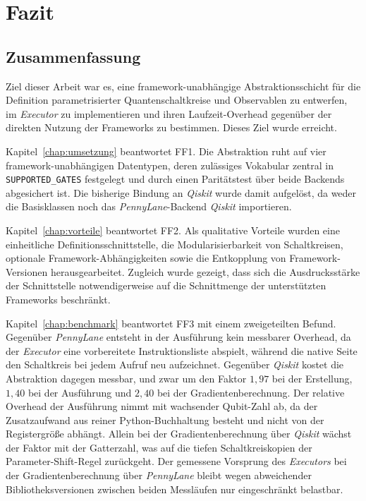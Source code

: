 \chapter{Fazit}
\label{chap:fazit}
\section{Zusammenfassung}

Ziel dieser Arbeit war es, eine framework-unabhängige Abstraktionsschicht für die
Definition parametrisierter Quantenschaltkreise und Observablen zu entwerfen, im
\textit{Executor} zu implementieren und ihren Laufzeit-Overhead gegenüber der
direkten Nutzung der Frameworks zu bestimmen. Dieses Ziel wurde erreicht.

Kapitel~\ref{chap:umsetzung} beantwortet FF1. Die Abstraktion ruht auf vier
framework-unabhängigen Datentypen, deren zulässiges Vokabular zentral in
\texttt{SUPPORTED\_GATES} festgelegt und durch einen Paritätstest über beide
Backends abgesichert ist. Die bisherige Bindung an \textit{Qiskit} wurde damit
aufgelöst, da weder die Basisklassen noch das \textit{PennyLane}-Backend
\textit{Qiskit} importieren.

Kapitel~\ref{chap:vorteile} beantwortet FF2. Als qualitative Vorteile wurden eine
einheitliche Definitionsschnittstelle, die Modularisierbarkeit von Schaltkreisen,
optionale Framework-Abhängigkeiten sowie die Entkopplung von Framework-Versionen
herausgearbeitet. Zugleich wurde gezeigt, dass sich die Ausdrucksstärke der
Schnittstelle notwendigerweise auf die Schnittmenge der unterstützten Frameworks
beschränkt.

Kapitel~\ref{chap:benchmark} beantwortet FF3 mit einem zweigeteilten Befund.
Gegenüber \textit{PennyLane} entsteht in der Ausführung kein messbarer Overhead, da
der \textit{Executor} eine vorbereitete Instruktionsliste abspielt, während die
native Seite den Schaltkreis bei jedem Aufruf neu aufzeichnet. Gegenüber
\textit{Qiskit} kostet die Abstraktion dagegen messbar, und zwar um den Faktor
$1{,}97$ bei der Erstellung, $1{,}40$ bei der Ausführung und $2{,}40$ bei der
Gradientenberechnung. Der relative Overhead der Ausführung nimmt mit wachsender
Qubit-Zahl ab, da der Zusatzaufwand aus reiner Python-Buchhaltung besteht und nicht
von der Registergröße abhängt. Allein bei der Gradientenberechnung über
\textit{Qiskit} wächst der Faktor mit der Gatterzahl, was auf die tiefen
Schaltkreiskopien der Parameter-Shift-Regel zurückgeht. Der gemessene Vorsprung des
\textit{Executors} bei der Gradientenberechnung über \textit{PennyLane} bleibt wegen
abweichender Bibliotheksversionen zwischen beiden Messläufen nur eingeschränkt
belastbar.

